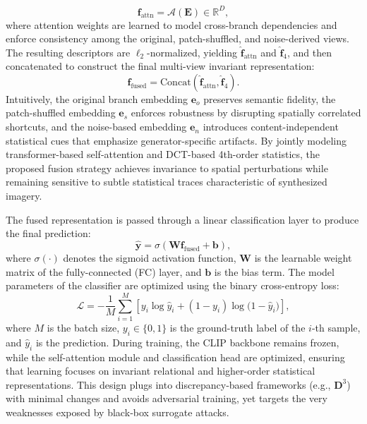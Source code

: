 \documentclass[letterpaper,twocolumn,10pt]{article}
\newcommand{\subhead}[1]{\vspace{1pt}\noindent{\textbf{#1.}}}
\newcommand{\bm}[1]{\mathbf{#1}} %
\begin{document}
\begin{equation}
	\bm{f}_{\mathrm{attn}} = \mathcal{A}(\bm{E}) \in \mathbb{R}^{D},
\end{equation}
where attention weights are learned to model cross-branch dependencies and enforce consistency among the original, patch-shuffled, and noise-derived views.
%
The resulting descriptors are $\ell_2$-normalized, yielding $\hat{\bm{f}}_{\mathrm{attn}}$ and $\hat{\bm{f}}_{4}$, and then concatenated to construct the final multi-view invariant representation:
\begin{equation}
	\bm{f}_{\mathrm{fused}} = \mathrm{Concat}(\hat{\bm{f}}_{\mathrm{attn}}, \hat{\bm{f}}_{4}).
\end{equation}
Intuitively, the original branch embedding $\bm{e}_o$ preserves semantic fidelity, the patch-shuffled embedding $\bm{e}_s$ enforces robustness by disrupting spatially correlated shortcuts, and the noise-based embedding $\bm{e}_n$ introduces content-independent statistical cues that emphasize generator-specific artifacts. By jointly modeling transformer-based self-attention and DCT-based 4th-order statistics, the proposed fusion strategy achieves invariance to spatial perturbations while remaining sensitive to subtle statistical traces characteristic of synthesized imagery.

\subhead{Classification head} 
The fused representation is passed through a linear classification layer to produce the final prediction:
\begin{equation}
	\hat{\bm{y}} = \sigma(\bm{W}\bm{f}_{\mathrm{fused}} + \bm{b}),
\end{equation}
where $\sigma(\cdot)$ denotes the sigmoid activation function, $\bm{W}$ is the learnable weight matrix of the fully-connected (FC) layer, and $\bm{b}$ is the bias term. The model parameters of the classifier are optimized using the binary cross-entropy loss:
\begin{equation}
\mathcal{L}=-\frac{1}{M}\sum_{i=1}^{M}\left[y_i \log \hat{y}_i +(1 - y_i)\log \big(1 - \hat{y}_i \big)\right],
\end{equation}
where $M$ is the batch size, $y_i \in \{0,1\}$ is the ground-truth label of the $i$-th sample, and $\hat{y}_i$ is the prediction. During training, the CLIP backbone remains frozen, while the self-attention module and classification head are optimized, ensuring that learning focuses on invariant relational and higher-order statistical representations. This design plugs into discrepancy‑based frameworks (e.g., $\bm{D}^3$) with minimal changes and avoids adversarial training, yet targets the very weaknesses exposed by black‑box surrogate attacks.
\end{document}
